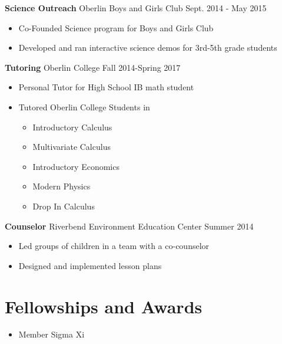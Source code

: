 \documentclass[margin]{res}
\begin{document}
\begin{resume}
	{\bf Science Outreach} Oberlin Boys and Girls Club \hfill Sept. 2014 - May 2015
	\begin{itemize} \itemsep -2pt  %
		\item Co-Founded Science program for Boys and Girls Club
		\item Developed and ran interactive science demos for 3rd-5th grade students
	\end{itemize}
	
	{\bf Tutoring} Oberlin College \hfill Fall 2014-Spring 2017 \\
	\vspace{-4mm}
	\begin{itemize} \itemsep -2pt
		\item Personal Tutor for High School IB math student
		\item Tutored Oberlin College Students in
		\begin{itemize} \itemsep -2pt  %
			\item Introductory Calculus
			\item Multivariate Calculus
			\item Introductory Economics
			\item Modern Physics
			\item Drop In Calculus
		\end{itemize}
	\end{itemize}
	\vspace{-2mm}

	
	 
	{\bf Counselor} Riverbend Environment Education Center \hfill Summer 2014
	\begin{itemize} \itemsep -2pt  %
		\item Led groups of children in  a team with a co-counselor
		\item Designed and implemented lesson plans
	\end{itemize}
	 
	
	
	 \section{Fellowships and Awards}
	\begin{itemize} \itemsep -2pt
	\item Member Sigma Xi
	\end{itemize}

\end{resume}
\end{document}
